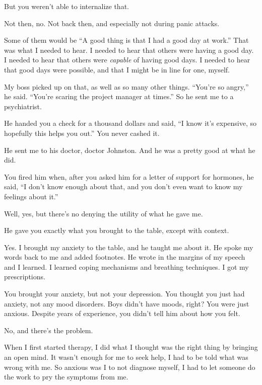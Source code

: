 \begin{paracol}{2}
\begin{leftcolumn}
\begin{ally}
But you weren't able to internalize that.
\end{ally}
Not then, no. Not back then, and especially not during panic attacks.

Some of them would be ``A good thing is that I had a good day at work.'' That was what I needed to hear. I needed to hear that others were having a good day. I needed to hear that others were \emph{capable} of having good days. I needed to hear that good days were possible, and that I might be in line for one, myself.

My boss picked up on that, as well as so many other things. ``You're so angry,'' he said. ``You're scaring the project manager at times.'' So he sent me to a psychiatrist.

\begin{ally}
He handed you a check for a thousand dollars and said, ``I know it's expensive, so hopefully this helps you out.'' You never cashed it.
\end{ally}
He sent me to his doctor, doctor Johnston. And he was a pretty good at what he did.

\begin{ally}
You fired him when, after you asked him for a letter of support for hormones, he said, ``I don't know enough about that, and you don't even want to know my feelings about it.''
\end{ally}
Well, yes, but there's no denying the utility of what he gave me.

\begin{ally}
He gave you exactly what you brought to the table, except with context.
\end{ally}
Yes. I brought my anxiety to the table, and he taught me about it. He spoke my words back to me and added footnotes. He wrote in the margins of my speech and I learned. I learned coping mechanisms and breathing techniques. I got my prescriptions.

\begin{ally}
You brought your anxiety, but not your depression. You thought you just had anxiety, not any mood disorders. Boys didn't have moods, right? You were just anxious. Despite years of experience, you didn't tell him about how you felt.
\end{ally}
No, and there's the problem.
\newpage

\noindent When I first started therapy, I did what I thought was the right thing by bringing an open mind. It wasn't enough for me to seek help, I had to be told what was wrong with me. So anxious was I to not diagnose myself, I had to let someone do the work to pry the symptoms from me.


\end{leftcolumn}
\end{paracol}
